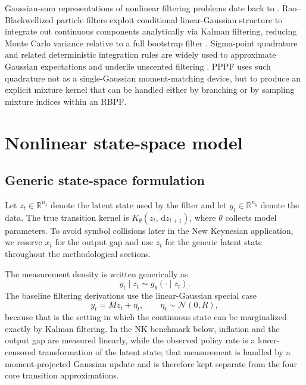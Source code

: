 \documentclass[11pt]{article}
\theoremstyle{remark}
\newcommand{\R}{\mathbb{R}}
\newcommand{\dd}{\,\mathrm{d}}
\begin{document}
Gaussian-sum representations of nonlinear filtering problems date back to \citet{AlspachSorenson1972}.
Rao--Blackwellized particle filters \citep{DoucetFreitasMurphyRussell2000} exploit conditional linear-Gaussian structure to integrate out continuous components analytically via Kalman filtering, reducing Monte Carlo variance relative to a full bootstrap filter \citep{GordonSalmondSmith1993}.
Sigma-point quadrature and related deterministic integration rules are widely used to approximate Gaussian expectations and underlie unscented filtering \citep{JulierUhlmann2004}.
PPPF uses such quadrature not as a single-Gaussian moment-matching device, but to produce an explicit mixture kernel that can be handled either by branching or by sampling mixture indices within an RBPF.

\section{Nonlinear state-space model}
\label{sec:ssm}

\subsection{Generic state-space formulation}

Let $z_t\in\R^{n_z}$ denote the latent state used by the filter and let $y_t\in\R^{n_y}$ denote the data.
The true transition kernel is $K_\theta(z_t,\dd z_{t+1})$, where $\theta$ collects model parameters.
To avoid symbol collisions later in the New Keynesian application, we reserve $x_t$ for the output gap and use $z_t$ for the generic latent state throughout the methodological sections.

The measurement density is written generically as
\begin{equation}
y_t \mid z_t \sim g_\theta(\cdot \mid z_t).
\label{eq:meas_generic}
\end{equation}
The baseline filtering derivations use the linear-Gaussian special case
\begin{equation}
y_t = M z_t + \eta_t,\qquad \eta_t \sim \mathcal{N}(0,R),
\label{eq:meas}
\end{equation}
because that is the setting in which the continuous state can be marginalized exactly by Kalman filtering.
In the NK benchmark below, inflation and the output gap are measured linearly, while the observed policy rate is a lower-censored transformation of the latent state; that measurement is handled by a moment-projected Gaussian update and is therefore kept separate from the four core transition approximations.
\end{document}
